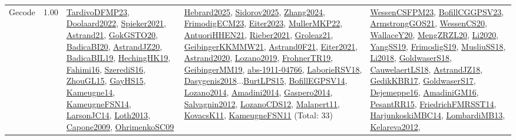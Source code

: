 {\begin{longtable}{p{3cm}r>{\raggedright\arraybackslash}p{6cm}>{\raggedright\arraybackslash}p{6cm}>{\raggedright\arraybackslash}p{8cm}}
\index{Gecode}\index{CPSystems!Gecode}Gecode &  1.00 & \hyperref[detail:TardivoDFMP23]{TardivoDFMP23}, \hyperref[detail:Doolaard2022]{Doolaard2022}, \hyperref[detail:Spieker2021]{Spieker2021}, \hyperref[detail:Astrand21]{Astrand21}, \hyperref[detail:GokGSTO20]{GokGSTO20}, \hyperref[detail:BadicaBI20]{BadicaBI20}, \hyperref[detail:AstrandJZ20]{AstrandJZ20}, \hyperref[detail:BadicaBIL19]{BadicaBIL19}, \hyperref[detail:HechingHK19]{HechingHK19}, \hyperref[detail:Fahimi16]{Fahimi16}, \hyperref[detail:SzerediS16]{SzerediS16}, \hyperref[detail:ZhouGL15]{ZhouGL15}, \hyperref[detail:GayHS15]{GayHS15}, \hyperref[detail:Kameugne14]{Kameugne14}, \hyperref[detail:KameugneFSN14]{KameugneFSN14}, \hyperref[detail:LarsonJC14]{LarsonJC14}, \hyperref[detail:Loth2013]{Loth2013}, \hyperref[detail:Capone2009]{Capone2009}, \hyperref[detail:OhrimenkoSC09]{OhrimenkoSC09} & \hyperref[detail:Hebrard2025]{Hebrard2025}, \hyperref[detail:Sidorov2025]{Sidorov2025}, \hyperref[detail:Zhang2024]{Zhang2024}, \hyperref[detail:FrimodigECM23]{FrimodigECM23}, \hyperref[detail:Eiter2023]{Eiter2023}, \hyperref[detail:MullerMKP22]{MullerMKP22}, \hyperref[detail:AntuoriHHEN21]{AntuoriHHEN21}, \hyperref[detail:Rieber2021]{Rieber2021}, \hyperref[detail:Groleaz21]{Groleaz21}, \hyperref[detail:GeibingerKKMMW21]{GeibingerKKMMW21}, \hyperref[detail:Astrand0F21]{Astrand0F21}, \hyperref[detail:Eiter2021]{Eiter2021}, \hyperref[detail:Astrand2020]{Astrand2020}, \hyperref[detail:Lozano2019]{Lozano2019}, \hyperref[detail:FrohnerTR19]{FrohnerTR19}, \hyperref[detail:GeibingerMM19]{GeibingerMM19}, \hyperref[detail:abs-1911-04766]{abs-1911-04766}, \hyperref[detail:LaborieRSV18]{LaborieRSV18}, \hyperref[detail:Dasygenis2018]{Dasygenis2018}...\hyperref[detail:BurtLPS15]{BurtLPS15}, \hyperref[detail:BofillEGPSV14]{BofillEGPSV14}, \hyperref[detail:Lozano2014]{Lozano2014}, \hyperref[detail:Amadini2014]{Amadini2014}, \hyperref[detail:Gaspero2014]{Gaspero2014}, \hyperref[detail:Salvagnin2012]{Salvagnin2012}, \hyperref[detail:LozanoCDS12]{LozanoCDS12}, \hyperref[detail:Malapert11]{Malapert11}, \hyperref[detail:KovacsK11]{KovacsK11}, \hyperref[detail:KameugneFSN11]{KameugneFSN11} (Total: 33) & \hyperref[detail:WessenCSFPM23]{WessenCSFPM23}, \hyperref[detail:BofillCGGPSV23]{BofillCGGPSV23}, \hyperref[detail:ArmstrongGOS21]{ArmstrongGOS21}, \hyperref[detail:WessenCS20]{WessenCS20}, \hyperref[detail:WallaceY20]{WallaceY20}, \hyperref[detail:MengZRZL20]{MengZRZL20}, \hyperref[detail:Li2020]{Li2020}, \hyperref[detail:YangSS19]{YangSS19}, \hyperref[detail:FrimodigS19]{FrimodigS19}, \hyperref[detail:MusliuSS18]{MusliuSS18}, \hyperref[detail:Li2018]{Li2018}, \hyperref[detail:GoldwaserS18]{GoldwaserS18}, \hyperref[detail:CauwelaertLS18]{CauwelaertLS18}, \hyperref[detail:AstrandJZ18]{AstrandJZ18}, \hyperref[detail:GedikKBR17]{GedikKBR17}, \hyperref[detail:GoldwaserS17]{GoldwaserS17}, \hyperref[detail:Dejemeppe16]{Dejemeppe16}, \hyperref[detail:AmadiniGM16]{AmadiniGM16}, \hyperref[detail:PesantRR15]{PesantRR15}, \hyperref[detail:FriedrichFMRSST14]{FriedrichFMRSST14}, \hyperref[detail:HarjunkoskiMBC14]{HarjunkoskiMBC14}, \hyperref[detail:LombardiMB13]{LombardiMB13}, \hyperref[detail:Kelareva2012]{Kelareva2012}, 
\end{longtable}}
